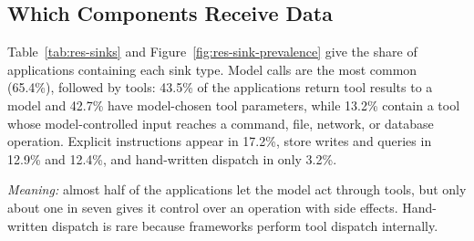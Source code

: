 \subsection{Which Components Receive Data}

Table~\ref{tab:res-sinks} and Figure~\ref{fig:res-sink-prevalence} give the share of applications containing each sink type. Model calls are the most common (65.4\%), followed by tools: 43.5\% of the applications return tool results to a model and 42.7\% have model-chosen tool parameters, while 13.2\% contain a tool whose model-controlled input reaches a command, file, network, or database operation. Explicit instructions appear in 17.2\%, store writes and queries in 12.9\% and 12.4\%, and hand-written dispatch in only 3.2\%.

\emph{Meaning:} almost half of the applications let the model act through tools, but only about one in seven gives it control over an operation with side effects. Hand-written dispatch is rare because frameworks perform tool dispatch internally.


